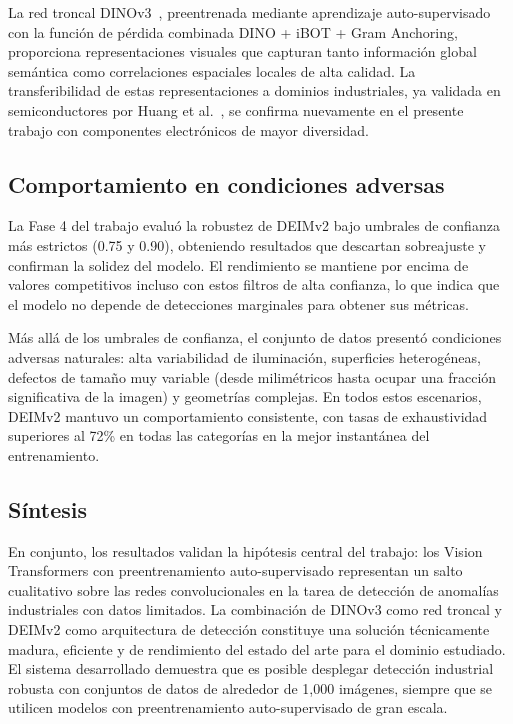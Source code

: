 La red troncal \acrshort{DINOv3}~\cite{simeoni2025dinov3}, preentrenada mediante aprendizaje auto-supervisado con la función de pérdida combinada DINO + iBOT + Gram Anchoring, proporciona representaciones visuales que capturan tanto información global semántica como correlaciones espaciales locales de alta calidad. La transferibilidad de estas representaciones a dominios industriales, ya validada en semiconductores por Huang et al.~\cite{huang2025semiconductor}, se confirma nuevamente en el presente trabajo con componentes electrónicos de mayor diversidad.

\subsection{Comportamiento en condiciones adversas}

La Fase 4 del trabajo evaluó la robustez de DEIMv2 bajo umbrales de confianza más estrictos (0.75 y 0.90), obteniendo resultados que descartan sobreajuste y confirman la solidez del modelo. El rendimiento se mantiene por encima de valores competitivos incluso con estos filtros de alta confianza, lo que indica que el modelo no depende de detecciones marginales para obtener sus métricas.

Más allá de los umbrales de confianza, el conjunto de datos presentó condiciones adversas naturales: alta variabilidad de iluminación, superficies heterogéneas, defectos de tamaño muy variable (desde milimétricos hasta ocupar una fracción significativa de la imagen) y geometrías complejas. En todos estos escenarios, DEIMv2 mantuvo un comportamiento consistente, con tasas de exhaustividad superiores al 72\% en todas las categorías en la mejor instantánea del entrenamiento.

\subsection{Síntesis}

En conjunto, los resultados validan la hipótesis central del trabajo: los Vision Transformers con preentrenamiento auto-supervisado representan un salto cualitativo sobre las redes convolucionales en la tarea de detección de anomalías industriales con datos limitados. La combinación de DINOv3 como red troncal y DEIMv2 como arquitectura de detección constituye una solución técnicamente madura, eficiente y de rendimiento del estado del arte para el dominio estudiado. El sistema desarrollado demuestra que es posible desplegar detección industrial robusta con conjuntos de datos de alrededor de 1{,}000 imágenes, siempre que se utilicen modelos con preentrenamiento auto-supervisado de gran escala.


